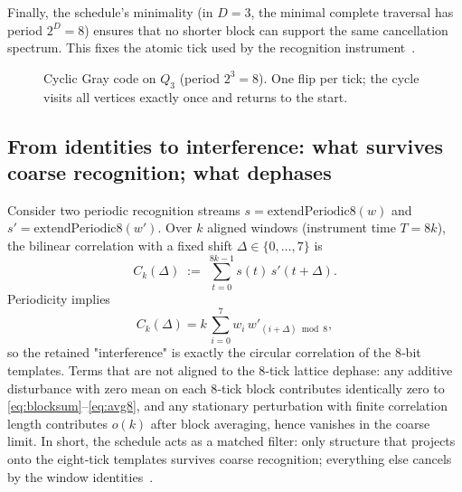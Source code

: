 \documentclass[12pt,a4paper]{article}
\theoremstyle{definition}
\theoremstyle{remark}
\begin{document}
Finally, the schedule's minimality (in \(D=3\), the minimal complete traversal has period \(2^D=8\)) ensures that no shorter block can support the same cancellation spectrum. This fixes the atomic tick used by the recognition instrument~\cite{Gray1953,Savage1997}.
\begin{figure}[t]
  \centering
  \caption{Cyclic Gray code on $Q_3$ (period $2^3=8$). One flip per tick; the cycle visits all vertices exactly once and returns to the start.}
\end{figure}

\subsection{From identities to interference: what survives coarse recognition; what dephases}
\label{sec:interference}

Consider two periodic recognition streams \(s=\mathrm{extendPeriodic8}(w)\) and \(s'=\mathrm{extendPeriodic8}(w')\). Over \(k\) aligned windows (instrument time \(T=8k\)), the bilinear correlation with a fixed shift \(\Delta\in\{0,\dots,7\}\) is
\[
C_k(\Delta)\;:=\;\sum_{t=0}^{8k-1} s(t)\,s'(t+\Delta).
\]
Periodicity implies
\[
C_k(\Delta)=k\,\sum_{i=0}^{7} w_i\,w'_{(i+\Delta)\bmod 8},
\]
so the retained "interference" is exactly the circular correlation of the 8‑bit templates. Terms that are not aligned to the 8‑tick lattice dephase: any additive disturbance with zero mean on each 8‑tick block contributes identically zero to \eqref{eq:blocksum}–\eqref{eq:avg8}, and any stationary perturbation with finite correlation length contributes \(o(k)\) after block averaging, hence vanishes in the coarse limit. In short, the schedule acts as a matched filter: only structure that projects onto the eight‑tick templates survives coarse recognition; everything else cancels by the window identities~\cite{Kay1998}.
\end{document}
